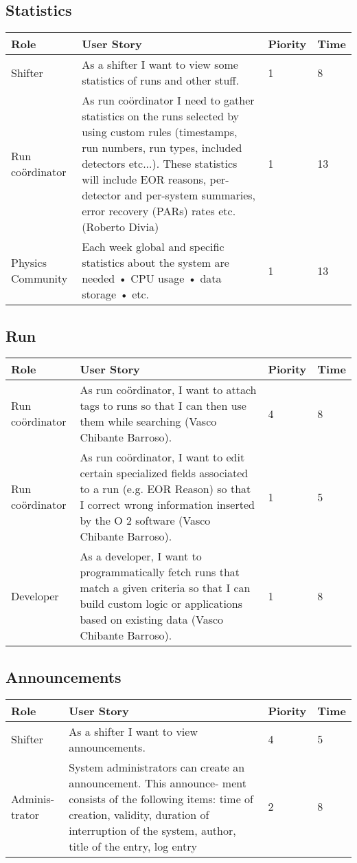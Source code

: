 \subsection{Statistics}
\begin{longtable}{ | p{2cm} | p{8cm} | p{1.5cm} | l |}
\hline
Role & User Story & Piority & Time \\ \hline
Shifter &  As a shifter I want to view some statistics of runs and other stuff. & 1 & 8 \\ \hline
Run coördinator &  As run coördinator I need to gather statistics on the runs selected by using custom rules (timestamps, run numbers, run types, included detectors etc...). These statistics will include EOR reasons, per-detector and per-system summaries, error recovery (PARs) rates etc.(Roberto Divia) & 1 & 13 \\ \hline
Physics Community &  Each week global and specific statistics about the system are needed
• CPU usage
• data storage
• etc. & 1 & 13 \\ \hline


\end{longtable}

\subsection{Run}
\begin{longtable}{ | p{2cm} | p{8cm} | p{1.5cm} | l |}
\hline
Role & User Story & Piority & Time \\ \hline
Run coördinator &  As run coördinator, I want to attach tags to runs so that I can then use them while searching (Vasco Chibante Barroso). & 4 & 8 \\ \hline
Run coördinator &  As run coördinator, I want to edit certain specialized fields associated to a run (e.g. EOR Reason) so that I correct wrong information inserted by the O 2 software (Vasco Chibante Barroso). & 1 & 5 \\ \hline
Developer &  As a developer, I want to programmatically fetch runs that match a
given criteria so that I can build custom logic or applications based on
existing data (Vasco Chibante Barroso). & 1 & 8 \\ \hline
\end{longtable}
\newpage
\subsection{Announcements}
\begin{longtable}{ | p{2cm} | p{8cm} | p{1.5cm} | l |}
\hline
Role & User Story & Piority & Time \\ \hline
Shifter &  As a shifter I want to view announcements. & 4 & 5 \\ \hline
Adminis-trator & System administrators can create an announcement. This announce-
ment consists of the following items: time of creation, validity, duration of interruption of the system, author, title of the entry, log entry & 2 & 8 \\ \hline
\end{longtable}

